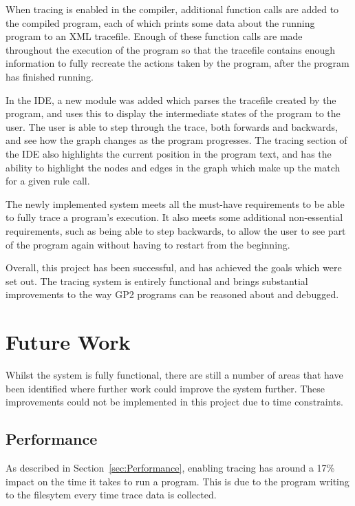 \documentclass[authoryearcitations]{UoYCSproject}
\begin{document}
When tracing is enabled in the compiler, additional function calls are added to
the compiled program, each of which prints some data about the running program
to an XML tracefile. Enough of these function calls are made throughout the
execution of the program so that the tracefile contains enough information to
fully recreate the actions taken by the program, after the program has finished
running.

In the IDE, a new module was added which parses the tracefile created by the
program, and uses this to display the intermediate states of the program to the
user. The user is able to step through the trace, both forwards and backwards,
and see how the graph changes as the program progresses. The tracing section of
the IDE also highlights the current position in the program text, and has the
ability to highlight the nodes and edges in the graph which make up the match
for a given rule call.

The newly implemented system meets all the must-have requirements to be able to
fully trace a program's execution. It also meets some additional non-essential
requirements, such as being able to step backwards, to allow the user to see
part of the program again without having to restart from the beginning.

Overall, this project has been successful, and has achieved the goals which were
set out. The tracing system is entirely functional and brings substantial
improvements to the way GP2 programs can be reasoned about and debugged.



\section{Future Work}
\label{sec:FutureWork}

Whilst the system is fully functional, there are still a number of areas that
have been identified where further work could improve the system further. These
improvements could not be implemented in this project due to time constraints.

\subsection{Performance}
\label{sec:FWPerformance}

As described in Section~\ref{sec:Performance}, enabling tracing has around a 17\%
impact on the time it takes to run a program. This is due to the program writing
to the filesytem every time trace data is collected.
\end{document}
